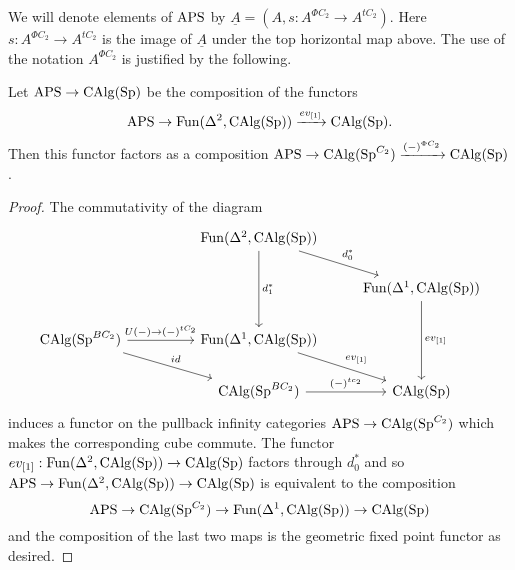 We will denote elements of $\mathrm{APS}$ by $\underline{A}=(A,s:A^{\Phi C_2}\to A^{tC_2})$. Here $s:A^{\Phi C_2}\to A^{tC_2}$ is the image of $\underline{A}$ under the top horizontal map above. The use of the notation $A^{\Phi C_2}$ is justified by the following.

\begin{lemma}
Let $\mathrm{APS}\to \operatorname{CAlg}(\operatorname{Sp})$ be the composition of the functors \[\mathrm{APS}\to \operatorname{Fun}(\Delta^2,\operatorname{CAlg}(\operatorname{Sp}))\xrightarrow{ev_{[1]}}\operatorname{CAlg}(\operatorname{Sp}).\] Then this functor factors as a composition $\mathrm{APS}\to \operatorname{CAlg}(\operatorname{Sp}^{C_2})\xrightarrow{(-)^{\Phi C_2}}\operatorname{CAlg}(\operatorname{Sp})$. 
\end{lemma}
\begin{proof}
The commutativity of the diagram
\[
\begin{tikzcd}
 & & \operatorname{Fun}(\Delta^2, \CAlg(\Sp)) \arrow[rd, "d_0^*"] \arrow[dd, "d_1^*"] & \\
 & & & \operatorname{Fun}(\Delta^1,\CAlg(\Sp)) \arrow[dd,"ev_{[1]}"]\\
\CAlg(\Sp^{BC_2}) \arrow[rr, "U(-)\to (-)^{tC_2}"] \arrow[rrd, "id"] & & \operatorname{Fun}(\Delta^1, \CAlg(\Sp)) \arrow[rd, "ev_{[1]}"] & \\
  & & \CAlg(\Sp^{BC_2}) \arrow[r, "(-)^{tc_2}"] & \CAlg(\Sp)
\end{tikzcd}
\] induces a functor on the pullback infinity categories $\mathrm{APS}\to \operatorname{CAlg}(\operatorname{Sp}^{C_2})$ which makes the corresponding cube commute. The functor $ev_{[1]}:\operatorname{Fun}(\Delta^2, \operatorname{CAlg}(\operatorname{Sp}))\to \operatorname{CAlg}(\operatorname{Sp})$ factors through $d_0^*$ and so $\mathrm{APS}\to \operatorname{Fun}(\Delta^2, \operatorname{CAlg}(\operatorname{Sp}))\to \operatorname{CAlg}(\operatorname{Sp})$ is equivalent to the composition \[\mathrm{APS}\to \operatorname{CAlg}(\operatorname{Sp}^{C_2})\to \operatorname{Fun}(\Delta^1,\operatorname{CAlg}(\operatorname{Sp}))\to \operatorname{CAlg}(\operatorname{Sp})\] and the composition of the last two maps is the geometric fixed point functor as desired.
\end{proof}

